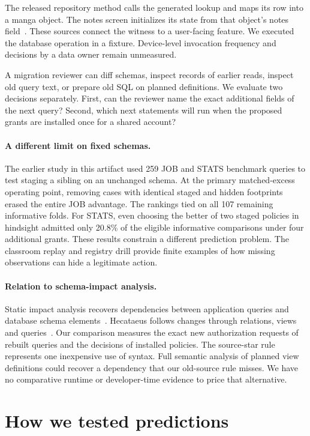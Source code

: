 \documentclass[11pt,a4paper]{article}
\begin{document}
The released repository method calls the generated lookup and maps its row into a manga object. The notes screen initializes its state from that object's notes field~\cite{mihon}. These sources connect the witness to a user-facing feature. We executed the database operation in a fixture. Device-level invocation frequency and decisions by a data owner remain unmeasured.

A migration reviewer can diff schemas, inspect records of earlier reads, inspect old query text, or prepare old SQL on planned definitions. We evaluate two decisions separately. First, can the reviewer name the exact additional fields of the next query? Second, which next statements will run when the proposed grants are installed once for a shared account?

\paragraph{A different limit on fixed schemas.} The earlier study in this artifact used 259 JOB and STATS benchmark queries to test staging a sibling on an unchanged schema. At the primary matched-excess operating point, removing cases with identical staged and hidden footprints erased the entire JOB advantage. The rankings tied on all 107 remaining informative folds. For STATS, even choosing the better of two staged policies in hindsight admitted only 20.8\% of the eligible informative comparisons under four additional grants. These results constrain a different prediction problem. The classroom replay and registry drill provide finite examples of how missing observations can hide a legitimate action.

\paragraph{Relation to schema-impact analysis.} Static impact analysis recovers dependencies between application queries and database schema elements~\cite{maule}. Hecataeus follows changes through relations, views and queries~\cite{hecataeus}. Our comparison measures the exact new authorization requests of rebuilt queries and the decisions of installed policies. The source-star rule represents one inexpensive use of syntax. Full semantic analysis of planned view definitions could recover a dependency that our old-source rule misses. We have no comparative runtime or developer-time evidence to price that alternative.

\newpage
\section{How we tested predictions}
\end{document}

